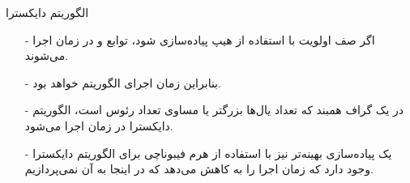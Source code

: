 \begin{frame}{‌الگوریتم دایکسترا}
\begin{itemize}\itemr
\item[-]
اگر صف اولویت با استفاده از هیپ پیاده‌سازی شود،
 توابع
و
در زمان
اجرا می‌شوند.
\item[-]
بنابراین زمان اجرای الگوریتم
خواهد بود.
\item[-]
در یک گراف همبند که تعداد یال‌ها بزرگتر یا مساوی تعداد رئوس است، الگوریتم دایکسترا در زمان
اجرا می‌شود.
\item[-]
یک پیاده‌سازی بهینه‌تر نیز با استفاده از هرم فیبوناچی برای الگوریتم دایکسترا وجود دارد که زمان اجرا را به
کاهش می‌دهد که در اینجا به آن نمی‌پردازیم.
\end{itemize}
\end{frame}